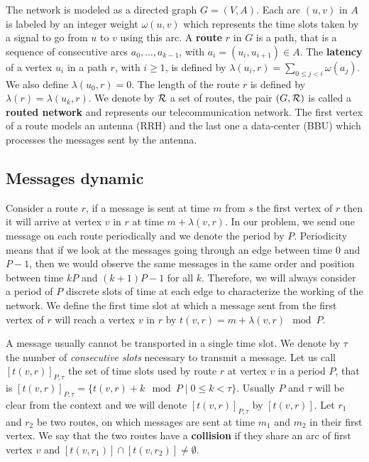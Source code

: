 \documentclass[a4paper,10pt]{article}
\begin{document}
The network is modeled as a directed graph $G=(V,A)$. Each arc  $(u,v)$ in $A$ is labeled by an integer weight $\omega(u,v)$ which represents the time slots taken by a signal to go from $u$ to $v$ using this arc. A {\bf route} $r$ in $G$ is a path, that is a sequence of consecutive arcs $a_0, \ldots , a_{k-1}$, with $a_i=(u_i,u_{i+1}) \in A$.  The {\bf latency} of a vertex $u_i$ in a path $r$, with $i \geq 1$, is defined by $\lambda(u_i,r)= \sum\limits_{0 \leq j <i} \omega(a_j)$. We also define $\lambda(u_0,r)=0$. The length of the route $r$ is defined by $\lambda (r)= \lambda (u_k,r)$.
We denote by $\cal R$ a set of routes, the pair $(G,\cal R)$ is called a {\bf routed network} and represents our telecommunication network.
The first vertex of a route models an antenna (RRH) and the last one a data-center (BBU) which processes the messages sent by the antenna.

   \subsection{Messages dynamic}
      
      Consider a route $r$, if a message is sent at time $m$ from $s$ the first vertex of $r$ then it will arrive at vertex $v$ in $r$ at time $m + \lambda(v,r)$. In our problem, we send one message on each route periodically and we denote the period by $P$.
      Periodicity means that if we look at the messages going through an edge between time $0$ and $P-1$, then we would observe the same messages in the same order and position between time $kP$ and $(k+1)P -1$ for all $k$. 
      Therefore, we will always consider a period of $P$ discrete slots of time at each edge to characterize the working of the network. We define the first time slot at which a message sent from the first vertex of $r$ will reach a vertex $v$ in $r$ by $t(v,r) = m + \lambda(v,r) \mod P$. 
      
      A message usually cannot be transported in a single time slot. We denote by $\tau$ the number 
      of \emph{consecutive slots} necessary to transmit a message. Let us call $[t(v,r)]_{P,\tau}$ the set of time slots used by route $r$ at vertex $v$ in a period $P$, that is $[t(v,r)]_{P,\tau} = \{t(v,r) + k \mod P \mid 0 \leq k < \tau \}$. Usually $P$ and $\tau$ will be clear from the context and we will denote $[t(v,r)]_{P,\tau}$ by $[t(v,r)]$.
      Let $r_1$ and $r_2$ be two routes, on which messages are sent at time $m_1$ and $m_2$ in their first vertex.
      We say that the two routes have a {\bf collision} if they share an arc of first vertex $v$ and $[t(v,r_{1})] \cap [t(v,r_{2})] \neq \emptyset$.
      
\end{document}
